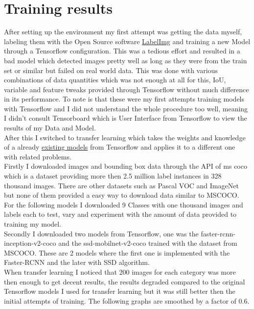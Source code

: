 \section{Training results}
After setting up the environment my first attempt was getting the data myself, labeling them with the Open Source software
\href{https://github.com/tzutalin/labelImg}{LabelImg} and training a new Model through a Tensorflow configuration. This was a tedious effort and
resulted in a bad model which detected images pretty well as long as they were from the train set or similar but failed on real world data.
This was done with various combinations of data quantities which was not enough at all for this, IoU, variable and feature tweaks provided
through Tensorflow without much difference in its performance. To note is that these were my first attempts training models with Tensorflow
and I did not understand the whole procedure too well, meaning I didn't consult Tensorboard which is User Interface from Tensorflow to view
the results of my Data and Model. \\ 
After this I switched to transfer learning which takes the weights and knowledge of a already
\href{https://github.com/tensorflow/models/blob/master/research/object_detection/g3doc/detection_model_zoo.md}{existing models} from
Tensorflow and applies it to a different one with related problems. \\ 
Firstly I downloaded images and bounding box data through the API of ms coco which is a dataset providing more then 2.5 million label
instances in 328 thousand images.\cite{mscoco} There are other datasets such as Pascal VOC and ImageNet but none of them provided a easy way to
download data similar to MSCOCO. For the following models I downloaded 9 Classes with one thousand images and labels each to test, vary and experiment
with the amount of data provided to training my model. \\
Secondly I downloaded two models from Tensorflow, one was the faster-rcnn-inception-v2-coco and the ssd-mobilnet-v2-coco trained with the
dataset from MSCOCO. These are 2 models where the first one is implemented with the Faster-RCNN and the later with SSD algorithm. \\
When transfer learning I noticed that 200 images for each category was more then enough to get decent results, the results degraded compared
to the original Tensorflow models I used for transfer learning but it was still better then the initial attempts of training. The following
graphs are smoothed by a factor of 0.6. \\ \\
